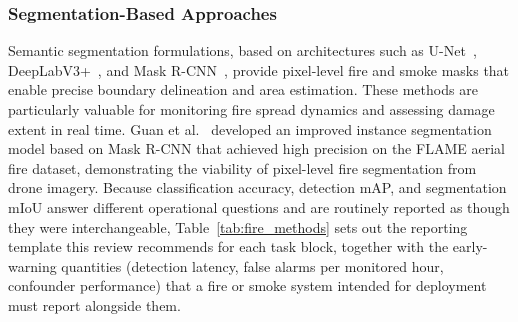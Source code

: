 \documentclass[10pt,a4paper]{article}
\begin{document}
\subsubsection{Segmentation-Based Approaches}

Semantic segmentation formulations, based on architectures such as U-Net~\citep{ronneberger2015unet}, DeepLabV3+~\citep{chen2018encoder}, and Mask R-CNN~\citep{he2017mask}, provide pixel-level fire and smoke masks that enable precise boundary delineation and area estimation. These methods are particularly valuable for monitoring fire spread dynamics and assessing damage extent in real time. Guan et al.~\citeyearpar{guan2022improved} developed an improved instance segmentation model based on Mask R-CNN that achieved high precision on the FLAME aerial fire dataset, demonstrating the viability of pixel-level fire segmentation from drone imagery. Because classification accuracy, detection mAP, and segmentation mIoU answer different operational questions and are routinely reported as though they were interchangeable, Table~\ref{tab:fire_methods} sets out the reporting template this review recommends for each task block, together with the early-warning quantities (detection latency, false alarms per monitored hour, confounder performance) that a fire or smoke system intended for deployment must report alongside them.
\end{document}
